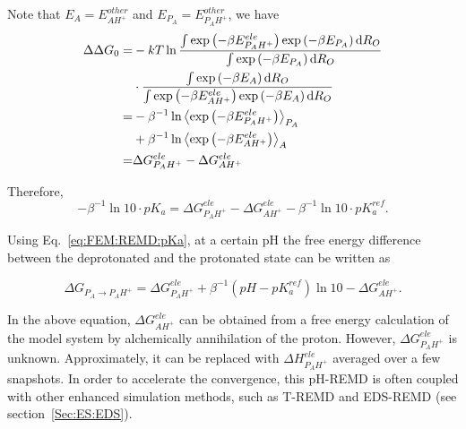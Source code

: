 Note that $E_{A}=E_{AH^{+}}^{other}$ and $E_{P_{A}}=E_{P_{A}H^{+}}^{other}$, we have
\begin{align}
	\Delta\Delta G_{0} = & -kT\ln\frac{\int\exp\left(-\beta E_{P_{A}H^{+}}^{ele}\right)\exp\left(-\beta E_{P_{A}}\right)\mathop{}\!\mathrm{d} R_{O}}{\int\exp\left(-\beta E_{P_{A}}\right)\mathop{}\!\mathrm{d} R_{O}}\\
	& \cdot \frac{\int\exp\left(-\beta E_{A}\right)\mathop{}\!\mathrm{d} R_{O}}{\int\exp\left(-\beta E_{AH^{+}}^{ele}\right)\exp\left(-\beta E_{A}\right)\mathop{}\!\mathrm{d} R_{O}}\\
	= & -\beta^{-1}\ln\left\langle \exp\left(-\beta E_{P_{A}H^{+}}^{ele}\right)\right\rangle _{P_{A}}\notag\\
	  &+\beta^{-1} \ln\left\langle \exp\left(-\beta E_{AH^{+}}^{ele}\right)\right\rangle _{A}\notag\\
	= & \Delta G_{P_{A}H^{+}}^{ele}-\Delta G_{AH^{+}}^{ele}  
\end{align}

Therefore,
\[
-\beta^{-1}\ln10\cdot pK_{a}=\Delta G_{P_{A}H^{+}}^{ele}-\Delta G_{AH^{+}}^{ele}-\beta^{-1}\ln10\cdot pK_{a}^{ref}.
\]

Using Eq.~\ref{eq:FEM:REMD:pKa}, at a certain pH the free energy difference between the deprotonated
and the protonated state can be written as

\[
\Delta G_{P_{A}\rightarrow P_{A}H^{+}}=\Delta G_{P_{A}H^{+}}^{ele}+\beta^{-1}(pH-pK_{a}^{ref})\ln10-\Delta G_{AH^{+}}^{ele}.
\]

In the above equation, $\Delta G_{AH^{+}}^{ele}$ can be obtained from a free energy calculation of the model system by alchemically annihilation of the proton. However, $\Delta G_{P_{A}H^{+}}^{ele}$ is unknown. Approximately, it can be replaced with $\Delta H_{P_{A}H^{+}}^{ele}$ averaged over a few snapshots.\cite{MengJCTC2010} In order to accelerate the convergence,
this pH-REMD is often coupled with other enhanced simulation methods, such as T-REMD\cite{MengJCTC2010} and EDS-REMD\cite{LeeJCTC2014} (see section~\ref{Sec:ES:EDS}).
